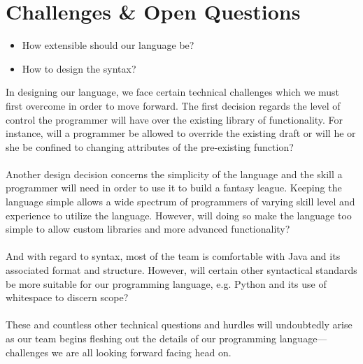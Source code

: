 \documentclass[12pt]{article}
\begin{document}
\section{Challenges \& Open Questions}
\begin{itemize}
\setlength{\itemsep}{1pt}
\item How extensible should our language be?
\item How to design the syntax?
\end{itemize}
In designing our language, we face certain technical challenges which we must first overcome in order to move forward. The first decision regards the level of control the programmer will have over the existing library of functionality. For instance, will a programmer be allowed to override the existing draft or will he or she be confined to changing attributes of the pre-existing function?
\\\\
Another design decision concerns the simplicity of the language and the skill a programmer will need in order to use it to build a fantasy league. Keeping the language simple allows a wide spectrum of programmers of varying skill level and experience to utilize the language. However, will doing so make the language too simple to allow custom libraries and more advanced functionality?
\\\\
And with regard to syntax, most of the team is comfortable with Java and its associated format and structure. However, will certain other syntactical standards be more suitable for our programming language, e.g. Python and its use of whitespace to discern scope?
\\\\
These and countless other technical questions and hurdles will undoubtedly arise as our team begins fleshing out the details of our programming language---challenges we are all looking forward facing head on.
\end{document}
